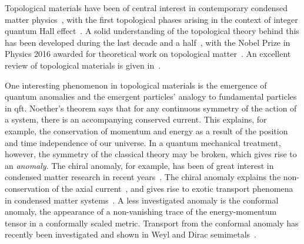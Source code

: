 %
Topological materials have been of central interest in contemporary condensed matter physics~\cite{fruchartIntroductionTopologicalInsulators2013}, with the first topological phases arising in the context of integer quantum Hall effect~\cites{klitzingNewMethodHighAccuracy1980}[as cited in][]{fruchartIntroductionTopologicalInsulators2013}.
A solid understanding of the topological theory behind this has been developed during the last decade and a half~\cite{fruchartIntroductionTopologicalInsulators2013, bernevigTopologicalInsulatorsTopological2013}, with the Nobel Prize in Physics 2016 awarded for theoretical work on topological matter~\cite{royalswedishacademyofsciencesNobelPrizePhysics}.
An excellent review of topological materials is given in~\cite{fruchartIntroductionTopologicalInsulators2013}.

One interesting phenomenon in topological materials is the emergence of quantum anomalies and the emergent particles' analogy to fundamental particles in \gls{qft}.
Noether's theorem says that for any continuous symmetry of the action of a system, there is an accompanying conserved current.
This explains, for example, the conservation of momentum and energy as a result of the position and time independence of our universe.
In a quantum mechanical treatment, however, the symmetry of the classical theory may be broken, which gives rise to an \emph{anomaly}.
The chiral anomaly, for example, has been of great interest in condensed matter research in recent years~\cite{arjonaFingerprintsConformalAnomaly2019}.
The chiral anomaly explains the non-conservation of the axial current~\cite{zeeQuantumFieldTheory2010}, and gives rise to exotic transport phenomena in condensed matter systems~\cite{burkovChiralAnomalyTransport2015, wehlingDiracMaterials2014, burkovTopologicalSemimetals2016}.
A less investigated anomaly is the conformal anomaly, the appearance of a non-vanishing trace of the energy-momentum tensor in a conformally scaled metric.
Transport from the conformal anomaly has recently been investigated and shown in Weyl and Dirac semimetals~\cite{chernodubAnomalousTransportDue2016, chernodubGenerationNernstCurrent2018, arjonaFingerprintsConformalAnomaly2019,arjonaromanoNovelThermoelectricElastic2019}.

